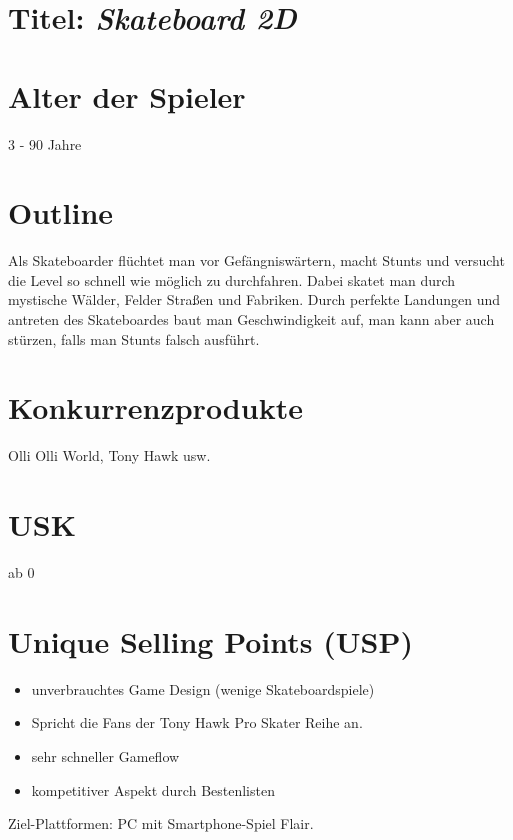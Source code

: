 \documentclass[12]{article}
\begin{document}
\section*{Titel: \textit{Skateboard 2D}} 

\section*{Alter der Spieler} 
	3 - 90 Jahre
	
\section*{Outline} 
	Als Skateboarder flüchtet man vor Gefängniswärtern, macht Stunts und
versucht die Level so schnell wie möglich zu durchfahren. Dabei skatet man durch
mystische Wälder, Felder Straßen und Fabriken. Durch perfekte Landungen und
antreten des Skateboardes baut man Geschwindigkeit auf, man kann aber auch
stürzen, falls man Stunts falsch ausführt.


\section*{Konkurrenzprodukte}
	Olli Olli World, Tony Hawk usw.
	
\section*{USK} ab 0

\section*{Unique Selling Points (USP)}
	\begin{itemize}
		\item unverbrauchtes Game Design (wenige Skateboardspiele)
		\item Spricht die Fans der Tony Hawk Pro Skater Reihe an.
		\item sehr schneller Gameflow
		\item kompetitiver Aspekt durch Bestenlisten
	\end{itemize}
	Ziel-Plattformen: PC mit Smartphone-Spiel Flair.
\end{document}
